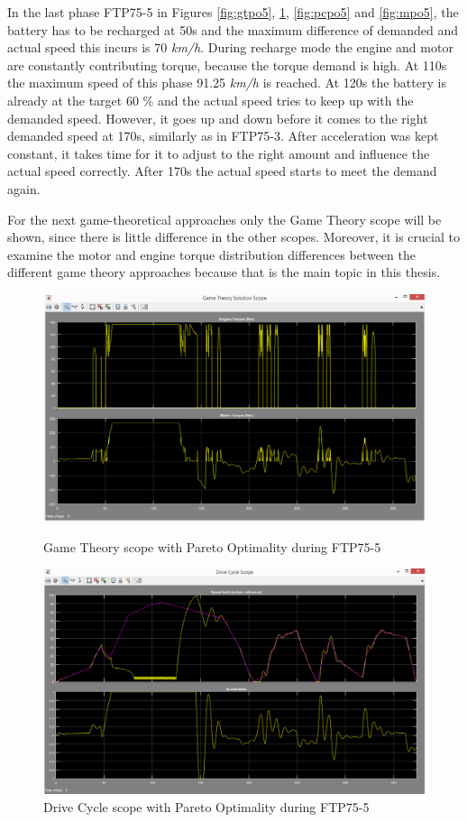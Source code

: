 In the last phase FTP75-5 in Figures \ref{fig:gtpo5}, \ref{fig:dcpo5}, \ref{fig:pcpo5} and \ref{fig:mpo5}, the battery has to be recharged at 50s and the maximum difference of demanded and actual speed this incurs is 70 \textit{km/h}. During recharge mode the engine and motor are constantly contributing torque, because the torque demand is high. At 110s the maximum speed of this phase 91.25 \textit{km/h} is reached. At 120s the battery is already at the target 60 \% and the actual speed tries to keep up with the demanded speed. However, it goes up and down before it comes to the right demanded speed at 170s, similarly as in FTP75-3. After acceleration was kept constant, it takes time for it to adjust to the right amount and influence the actual speed correctly. After 170s the actual speed starts to meet the demand again. 

For the next game-theoretical approaches only the Game Theory scope will be shown, since there is little difference in the other scopes. Moreover, it is crucial to examine the motor and engine torque distribution differences between the different game theory approaches because that is the main topic in this thesis.

\begin{figure}[hp]
\centering
\includegraphics[scale=0.45]{figures/Pareto/FTP75-5/gameTheory05Juli}
\caption{Game Theory scope with Pareto Optimality during FTP75-5}
\label{fig:gtpo5}
\includegraphics[scale=0.41]{figures/Pareto/FTP75-5/driveCycle05Juli}
\caption{Drive Cycle scope with Pareto Optimality during FTP75-5}
\label{fig:dcpo5}
\end{figure}

